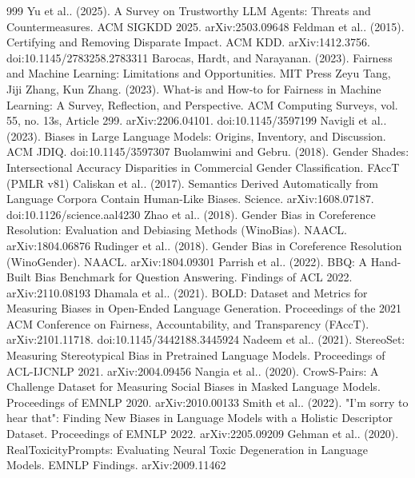 \documentclass[10pt]{article}
\begin{document}
\begin{thebibliography}{999}
 Yu et al.. (2025). A Survey on Trustworthy LLM Agents: Threats and Countermeasures. ACM SIGKDD 2025. arXiv:2503.09648
 Feldman et al.. (2015). Certifying and Removing Disparate Impact. ACM KDD. arXiv:1412.3756. doi:10.1145/2783258.2783311
 Barocas, Hardt, and Narayanan. (2023). Fairness and Machine Learning: Limitations and Opportunities. MIT Press
 Zeyu Tang, Jiji Zhang, Kun Zhang. (2023). What-is and How-to for Fairness in Machine Learning: A Survey, Reflection, and Perspective. ACM Computing Surveys, vol. 55, no. 13s, Article 299. arXiv:2206.04101. doi:10.1145/3597199
 Navigli et al.. (2023). Biases in Large Language Models: Origins, Inventory, and Discussion. ACM JDIQ. doi:10.1145/3597307
 Buolamwini and Gebru. (2018). Gender Shades: Intersectional Accuracy Disparities in Commercial Gender Classification. FAccT (PMLR v81)
 Caliskan et al.. (2017). Semantics Derived Automatically from Language Corpora Contain Human-Like Biases. Science. arXiv:1608.07187. doi:10.1126/science.aal4230
 Zhao et al.. (2018). Gender Bias in Coreference Resolution: Evaluation and Debiasing Methods (WinoBias). NAACL. arXiv:1804.06876
 Rudinger et al.. (2018). Gender Bias in Coreference Resolution (WinoGender). NAACL. arXiv:1804.09301
 Parrish et al.. (2022). BBQ: A Hand-Built Bias Benchmark for Question Answering. Findings of ACL 2022. arXiv:2110.08193
 Dhamala et al.. (2021). BOLD: Dataset and Metrics for Measuring Biases in Open-Ended Language Generation. Proceedings of the 2021 ACM Conference on Fairness, Accountability, and Transparency (FAccT). arXiv:2101.11718. doi:10.1145/3442188.3445924
 Nadeem et al.. (2021). StereoSet: Measuring Stereotypical Bias in Pretrained Language Models. Proceedings of ACL-IJCNLP 2021. arXiv:2004.09456
 Nangia et al.. (2020). CrowS-Pairs: A Challenge Dataset for Measuring Social Biases in Masked Language Models. Proceedings of EMNLP 2020. arXiv:2010.00133
 Smith et al.. (2022). "I'm sorry to hear that": Finding New Biases in Language Models with a Holistic Descriptor Dataset. Proceedings of EMNLP 2022. arXiv:2205.09209
 Gehman et al.. (2020). RealToxicityPrompts: Evaluating Neural Toxic Degeneration in Language Models. EMNLP Findings. arXiv:2009.11462

\end{thebibliography}
\end{document}
